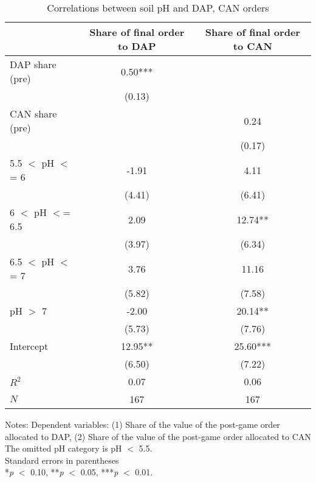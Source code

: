 \begin{table}[htbp]
\centering
\hspace*{-1.2cm}
\begin{threeparttable}
\caption{Correlations between soil pH and DAP, CAN orders}
\label{tab:ph_dapcanshare}
\begin{tabular}{l cc}
\hline
\hline
                    &Share of final order to DAP    &Share of final order to CAN   \\
\hline
DAP share (pre)     &        0.50***&               \\
                    &      (0.13)   &               \\
CAN share (pre)     &               &        0.24   \\
                    &               &      (0.17)   \\
5.5 $<$ pH $<$= 6       &       -1.91   &        4.11   \\
                    &      (4.41)   &      (6.41)   \\
6 $<$ pH $<$= 6.5       &        2.09   &       12.74** \\
                    &      (3.97)   &      (6.34)   \\
6.5 $<$ pH $<$= 7       &        3.76   &       11.16   \\
                    &      (5.82)   &      (7.58)   \\
pH $>$ 7              &       -2.00   &       20.14** \\
                    &      (5.73)   &      (7.76)   \\
Intercept           &       12.95** &       25.60***\\
                    &      (6.50)   &      (7.22)   \\
\hline
$R^2$               &        0.07   &        0.06   \\
$N$                 &         167   &         167   \\
\hline
\hline
\end{tabular}
\begin{tablenotes}
\footnotesize
\item{Notes: Dependent variables: (1) Share of the value of the post-game order allocated to DAP, (2) Share of the value of the post-game order allocated to CAN \\ The omitted pH category is pH $<$ 5.5. \\ Standard errors in parentheses \\ *\textit{p} $<$ 0.10, **\textit{p} $<$ 0.05, ***\textit{p} $<$ 0.01.}
\end{tablenotes}
\end{threeparttable}
\end{table}
